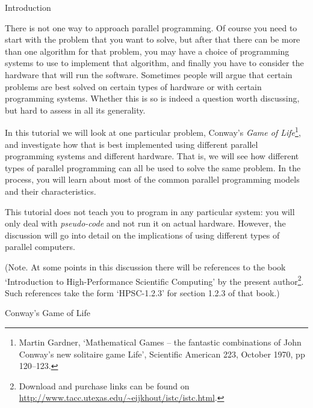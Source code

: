  {Introduction}

There is not one way to approach parallel programming. 
Of course you need to start with the problem that you want to solve,
but after that there can be more than one algorithm for that problem,
you may have a choice of programming systems to use
to implement that algorithm, and finally 
you have to consider the hardware that will run 
the software. Sometimes people will argue that certain problems are best solved
on certain types of hardware or with certain programming systems.
Whether this is so is indeed a question worth discussing, but 
hard to assess in all its generality.

In this tutorial we will look at one particular problem, Conway's
\emph{Game of Life}\footnote{Martin Gardner, `Mathematical Games --
  the fantastic combinations of John Conway's new solitaire game
  Life', Scientific American 223, October 1970, pp 120--123.}, and
investigate how that is best implemented using different parallel
programming systems and different hardware. That is, we will see how
different types of parallel programming can all be used to solve the
same problem.  In the process, you will learn about most of the common
parallel programming models and their characteristics.

This tutorial does not teach you to program in any particular
system: you  will only deal with \emph{pseudo-code}
and not run it on actual hardware. However, the discussion
will go into detail on the implications of using different
types of parallel computers.

(Note. At some points in this discussion there will be references to
the book `Introduction to High-Performance Scientific Computing' by
the present author\footnote{Download and purchase links can be found
  on \url{http://www.tacc.utexas.edu/~eijkhout/istc/istc.html}.}. Such
references take the form `HPSC-1.2.3' for section 1.2.3 of that book.)

 {Conway's Game of Life}

